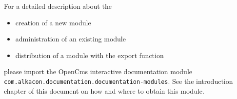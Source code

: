 For a detailed description about the

\begin{itemize}

\item creation of a new module

\item administration of an existing module

\item distribution of a module with the export function 

\end{itemize}

please import the OpenCms interactive documentation module {\tt com.alkacon.documentation.documentation-modules}.
See the introduction chapter of this document on how and where to obtain this module.